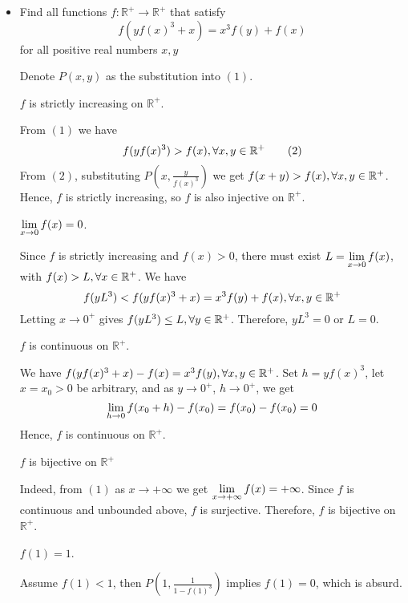 \documentclass[11pt]{scrartcl}
\begin{document}
\begin{itemize}[label=, leftmargin=0em, itemsep=0.2em]
\begin{sol}
    \end{sol}

    \item \begin{bt}
        Find all functions $f: \mathbb{R^+} \to \mathbb{R^+}$ that satisfy
        \[
        f\left(y f(x)^3+x\right)=x^3 f(y)+f(x)\tag{1}
        \]
        for all positive real numbers $x,y$
    \end{bt}
    \begin{sol}
        Denote $P(x,y)$ as the substitution into $(1)$.
        
         $f$ is strictly increasing on $\mathbb{R^+}$. 
        \begin{pro}
            From $(1)$ we have 
        \[
            f(yf(x)^3) > f(x), \forall x,y \in \mathbb{R^+} \tag{2}
        \]
        From $(2)$, substituting $P\left(x,\frac{y}{f(x)^3}\right)$ we get $f(x + y) > f(x), \forall x,y \in \mathbb{R^+}$. Hence, $f$ is strictly increasing, so $f$ is also injective on $\mathbb{R^+}$.
        \end{pro}

         $\displaystyle\lim_{x \to 0}f(x) = 0$. 
        \begin{pro}
            Since $f$ is strictly increasing and $f(x) > 0$, there must exist $L = \displaystyle\lim_{x \to 0}f(x)$, with $f(x) > L, \forall x\in \mathbb{R^+}$. We have 
            \[
            f(yL^3) < f(yf(x)^3 + x) = x^3f(y) + f(x), \forall x,y \in \mathbb{R^+}
            \]
            Letting $x \to 0^+$ gives $f(yL^3) \leq L, \forall y\in \mathbb{R^+}$. Therefore, $yL^3 = 0$ or $L = 0$.
            
        \end{pro}
         $f$ is continuous on $\mathbb{R^+}$. 
        \begin{pro}
            We have $f(yf(x)^3 + x) - f(x) = x^3f(y), \forall x,y \in \mathbb{R^+}$. Set $h = yf(x)^3$, let $x = x_0 > 0$ be arbitrary, and as $y \to 0^+$, $h \to 0^+$, we get 
            \[
                \displaystyle\lim_{h \to 0} f(x_0 + h) - f(x_0) =  f(x_0) - f(x_0) = 0
            \]
            Hence, $f$ is continuous on $\mathbb{R^+}$.
        \end{pro}
        
         $f$ is bijective on $\mathbb{R^+}$
        \begin{pro}
            Indeed, from $(1)$ as $x \to +\infty$ we get $\displaystyle\lim_{x \to +\infty} f(x) = +\infty$. Since $f$ is continuous and unbounded above, $f$ is surjective. Therefore, $f$ is bijective on $\mathbb{R^+}$.
        \end{pro}
         $f(1) = 1$. 
        \begin{pro}
            Assume $f(1) < 1$, then $P\left(1,\frac{1}{1-f(1)^3}\right)$ implies $f(1) = 0$, which is absurd.


\end{pro}
\end{sol}
\end{itemize}
\end{document}
